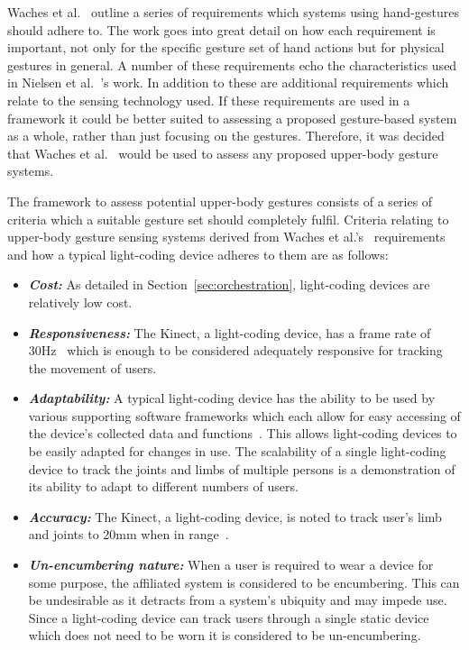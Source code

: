 \documentclass[link]{IWCOMP}
\begin{document}
Waches et al.~\citeyearpar{Wachs2011} outline a series of requirements which systems using hand-gestures should adhere to.
The work goes into great detail on how each requirement is important, not only for the specific gesture set of hand actions but for physical gestures in general.
A number of these requirements echo the characteristics used in Nielsen et al.~\citeyearpar{Nielsen2004}'s work.
In addition to these are additional requirements which relate to the sensing technology used.
If these requirements are used in a framework it could be better suited to assessing a proposed gesture-based system as a whole, rather than just focusing on the gestures.
Therefore, it was decided that Waches et al.~\citeyearpar{Wachs2011} would be used to assess any proposed upper-body gesture systems.

The framework to assess potential upper-body gestures consists of a series of criteria which a suitable gesture set should completely fulfil.
Criteria relating to upper-body gesture sensing systems derived from Waches et al.'s~\citeyearpar{Wachs2011} requirements and how a typical light-coding device adheres to them are as follows:

\begin{itemize}
\item  \textit{\textbf{Cost:}} As detailed in Section~\ref{sec:orchestration}, light-coding devices are relatively low cost.
\item \textit{\textbf{Responsiveness:}} The Kinect, a light-coding device, has a frame rate of 30Hz~\cite{Livingston2012} which is enough to be considered adequately responsive for tracking the movement of users.
\item \textit{\textbf{Adaptability:}} A typical light-coding device has the ability to be used by various supporting software frameworks which each allow for easy accessing of the device's collected data and functions~\cite{Goth2011}.
This allows light-coding devices to be easily adapted for changes in use.
The scalability of a single light-coding device  to track the joints and limbs of multiple persons is a demonstration of its ability to adapt to different numbers of users.
\item \textit{\textbf{Accuracy:}} The Kinect, a light-coding device, is noted to track user's limb and joints to 20mm when in range~\cite{Marquardt2011}. 
\item \textit{\textbf{Un-encumbering nature:}} When a user is required to wear a device for some purpose, the affiliated system is considered to be encumbering.
This can be undesirable as it detracts from a system's ubiquity and may impede use. 
Since a light-coding device can track users through a single static device which does not need to be worn it is considered to be un-encumbering.\\ 
\end{itemize}
\end{document}
